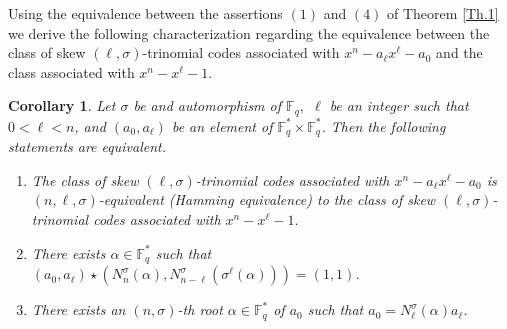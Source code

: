 \documentclass[12pt,paper]{article}
\theoremstyle{plain}
\newtheorem{corollary}[theorem]{Corollary}
\newcommand{\Fq}{\mathbb{F}_{q}}
\begin{document}
Using the equivalence between the assertions $(1)$ and $(4)$ of Theorem \ref{Th.1} we derive the following characterization regarding the equivalence between the class of skew $(\ell,\sigma)$-trinomial codes  associated with  $x^n - a_{\ell}x^{\ell} - a_0$ and the class  associated with $x^n - x^{\ell} - 1.$
\begin{corollary}  \label{Equiv_1}
Let $\sigma$ be and automorphism of $ \Fq,$ $\ell$ be an integer such that  $0<\ell<n$,  and  $(a_0, a_{\ell})$ be an element of $\mathbb{F}_q^{*} \times \mathbb{F}_q^{*}$. 
Then the following statements are equivalent.
    \begin{enumerate}
        \item  The class of skew  $(\ell,\sigma)$-trinomial codes  associated with  $x^n - a_{\ell}x^{\ell} - a_0$ is $(n,\ell,\sigma)$-equivalent (Hamming equivalence) to the class of   skew $(\ell,\sigma)$-trinomial codes  associated with $x^n - x^{\ell} - 1.$
        \item  There exists $ \alpha \in \Fq^*$ such that $(a_0, a_{\ell})\star\left(N^{\sigma}_{n}(\alpha), N^{\sigma}_{n-\ell}(\sigma^{\ell}(\alpha)) \right)= (1, 1)$. 
        \item  There exists  an $(n,\sigma)$-th root  $\alpha \in \Fq^* $  of $a_0$     such that $   a_0 =  N^{\sigma}_{\ell}(\alpha) a_\ell $.
        \end{enumerate}
\end{corollary}
\end{document}
